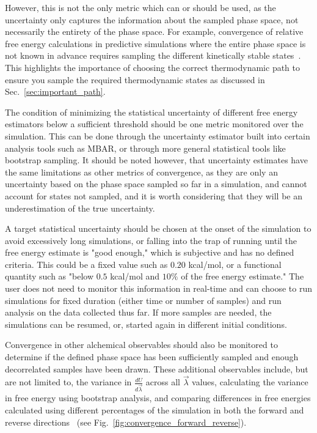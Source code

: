 \documentclass[9pt,bestpractices]{livecoms}
\begin{document}
However, this is not the only metric which can or should be used, as the uncertainty only captures the information about the sampled phase space, not necessarily the entirety of the phase space.  
For example, convergence of relative free energy calculations in predictive simulations where the entire phase space is not known in advance requires sampling the different kinetically stable states~\cite{mobley2012perspective}. 
This highlights the importance of choosing the correct thermodynamic path to ensure you sample the required thermodynamic states as discussed in Sec.~\ref{sec:important_path}.

The condition of minimizing the statistical uncertainty of different free energy estimators below a sufficient threshold should be one metric monitored over the simulation. This can be done through the uncertainty estimator built into certain analysis tools such as MBAR, or through more general statistical tools like bootstrap sampling. It should be noted however, that uncertainty estimates have the same limitations as other metrics of convergence, as they are only an uncertainty based on the phase space sampled so far in a simulation, and cannot account for states not sampled, and it is worth considering that they will be an underestimation of the true uncertainty.

A target statistical uncertainty should be chosen at the onset of the simulation to avoid excessively long simulations, or falling into the trap of running until the free energy estimate is "good enough," which is subjective and has no defined criteria. This could be a fixed value such as $0.20$ kcal/mol, or a functional quantity such as "below $0.5$ kcal/mol and $10\%$ of the free energy estimate." The user does not need to monitor this information in real-time and can choose to run simulations for fixed duration (either time or number of samples) and run analysis on the data collected thus far. If more samples are needed, the simulations can be resumed, or, started again in different initial conditions. 

Convergence in other alchemical observables should also be monitored to determine if the defined phase space has been sufficiently sampled and enough decorrelated samples have been drawn. These additional observables include, but are not limited to, the variance in $\frac{dU}{d\vec{\lambda}}$ across all $\vec{\lambda}$ values, calculating the variance in free energy using bootstrap analysis, and comparing differences in free energies calculated using different percentages of the simulation in both the forward and reverse directions~\cite{klimovich2015guidelines} (see Fig.~\ref{fig:convergence_forward_reverse}).
\end{document}
